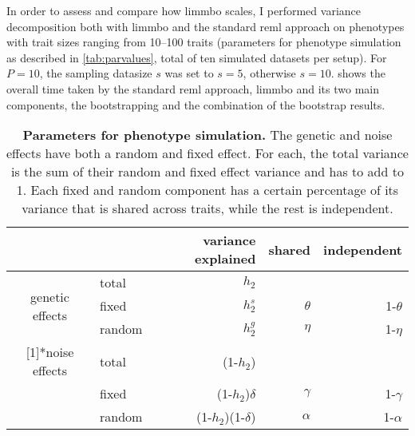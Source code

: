 In order to assess and compare how \gls{limmbo} scales, I performed variance decomposition both with \gls{limmbo} and the standard \gls{reml} approach on phenotypes with trait sizes ranging from \numrange{10}{100} traits (parameters for phenotype simulation as described in \cref{tab:parvalues}, total of ten simulated datasets per setup). For \(P=10\), the sampling datasize \(s\) was set to \(s=5\), otherwise  \(s=10\).   shows the overall time taken by the standard \gls{reml} approach, \gls{limmbo} and its two main components, the bootstrapping and the combination of the bootstrap results.
\begin{table}[htbp]
  \centering
  \caption[\textbf{Parameters for phenotype simulation.}]{\textbf{Parameters for phenotype simulation.} The genetic and noise effects have both a random and fixed effect. For each, the total variance is the sum of their random and fixed effect variance and has to add to 1. Each fixed and random component has a certain percentage of its variance that is shared across traits, while the rest is independent.}
    \begin{tabular}{clrrr}
    \toprule
          &       & variance explained & shared & independent \\
    \midrule
    \multirow{3}[1]{*}{genetic effects} & total & \(h_2\) &       &  \\
          & fixed & \(h_2^s\) & \(\theta\) & 1-\(\theta\) \\
          & random & \(h_2^g\) & \(\eta\) & 1-\(\eta\) \\
   \addlinespace[1.5ex]
    \multirow{3}[1]{*}{noise effects} & total & (1-\(h_2\)) &       &  \\
          & fixed & (1-\(h_2\))\(\delta\) & \(\gamma\) & 1-\(\gamma\) \\
          & random & (1-\(h_2\))(1-\(\delta\)) & \(\alpha\) & 1-\(\alpha\) \\
    \bottomrule
    \end{tabular}%
  \label{tab:pardescription}%
\end{table}%
%
